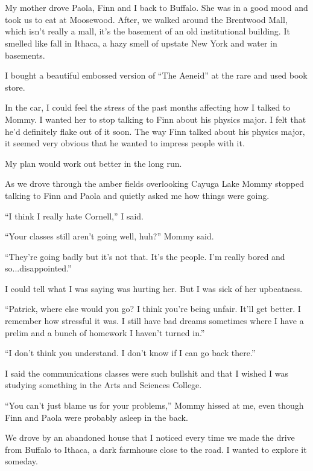 \section{}

My mother drove Paola, Finn and I back to Buffalo.  She was in a good mood and
took us to eat at Moosewood.  After, we walked around the Brentwood Mall, which
isn't really a mall, it's the basement of an old institutional building.  It
smelled like fall in Ithaca, a hazy smell of upstate New York and water in
basements. 

I bought a beautiful embossed version of ``The Aeneid'' at the rare and used book
store. 

In the car, I could feel the stress of the past months affecting how I talked
to Mommy. I  wanted her to stop talking to Finn about his physics major.  I
felt that he'd definitely flake out of it soon.  The way Finn talked about his
physics major, it seemed very obvious that he wanted to impress people with it. 

My plan would work out better in the long run.

As we drove through the amber fields overlooking Cayuga Lake Mommy stopped
talking to Finn and Paola and quietly asked me how things were going.

``I think I really hate Cornell,'' I said.

``Your classes still aren't going well, huh?'' Mommy said. 

``They're going badly but it's not that.  It's the people.  I'm really bored and
so...disappointed.''

I could tell what I was saying was hurting her.  But I was sick of her
upbeatness.

``Patrick, where else would you go?  I think you're being unfair.  It'll get
better.  I remember how stressful it was.  I still have bad dreams sometimes
where I have a prelim and a bunch of homework I haven't turned in.''

``I don't think you understand.  I don't know if I can go back there.''

I said the communications classes were such bullshit and that I wished I was
studying something in the Arts and Sciences College.  

``You can't just blame us for your problems,'' Mommy hissed at me, even though Finn
and Paola were probably asleep in the back.

We drove by an abandoned house that I noticed every time we made the drive from
Buffalo to Ithaca, a dark farmhouse close to the road.  I wanted to
explore it someday.

